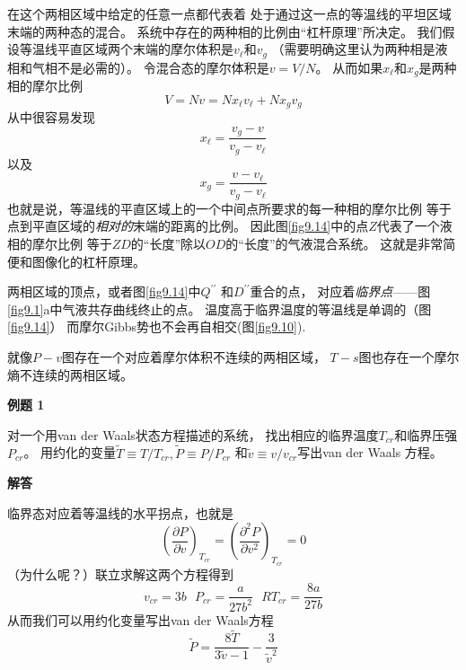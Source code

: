在这个两相区域中给定的任意一点都代表着
处于通过这一点的等温线的平坦区域末端的两种态的混合。
系统中存在的两种相的比例由“杠杆原理”所决定。
我们假设等温线平直区域两个末端的摩尔体积是$v_\ell$和$v_g$
（需要明确这里认为两种相是液相和气相不是必需的）。
令混合态的摩尔体积是$v=V/N$。
从而如果$x_\ell$和$x_g$是两种相的摩尔比例
\begin{equation}
\label{equ9.25}
V=Nv=Nx_\ell v_\ell+Nx_gv_g
\end{equation}
从中很容易发现
\begin{equation}
\label{equ9.26}
x_\ell=\frac{v_g-v}{v_g-v_\ell}
\end{equation}
以及
\begin{equation}
\label{equ9.27}
x_g=\frac{v-v_\ell}{v_g-v_\ell}
\end{equation}
也就是说，等温线的平直区域上的一个中间点所要求的每一种相的摩尔比例
等于点到平直区域的{\it 相对的}末端的距离的比例。
因此图\ref{fig9.14}中的点$Z$代表了一个液相的摩尔比例
等于$ZD$的“长度”除以$OD$的“长度”的气液混合系统。
这就是非常简便和图像化的杠杆原理。

两相区域的顶点，或者图\ref{fig9.14}中$Q^{\prime\prime}$
和$D^{\prime\prime}$重合的点，
对应着{\it 临界点}——图\ref{fig9.1}a中气液共存曲线终止的点。
温度高于临界温度的等温线是单调的（图\ref{fig9.14}）
而摩尔Gibbs势也不会再自相交(图\ref{fig9.10}).

就像$P-v$图存在一个对应着摩尔体积不连续的两相区域，
$T-s$图也存在一个摩尔熵不连续的两相区域。

{\bf 例题 1}

对一个用van der Waals状态方程描述的系统，
找出相应的临界温度$T_{cr}$和临界压强$P_{cr}$。
用约化的变量$\tilde{T}\equiv T/T_{cr},\tilde{P}\equiv P/P_{cr}$
和$\tilde{v}\equiv v/v_{cr}$写出van der Waals 方程。


{\bf 解答}

临界态对应着等温线的水平拐点，也就是
\begin{equation*}
\left(\frac{\partial P}{\partial v}\right)_{T_{cr}}
=\left(\frac{\partial^2 P}{\partial v^2}\right)_{T_{cr}}=0
\end{equation*}
（为什么呢？）联立求解这两个方程得到
\begin{equation*}
v_{cr}=3b~~~P_{cr}=\frac{a}{27b^2}~~~RT_{cr}=\frac{8a}{27b}
\end{equation*}
从而我们可以用约化变量写出van der Waals方程
\begin{equation*}
\tilde{P}=\frac{8\tilde{T}}{3\tilde{v}-1}-\frac{3}{\tilde{v}^2}
\end{equation*}


